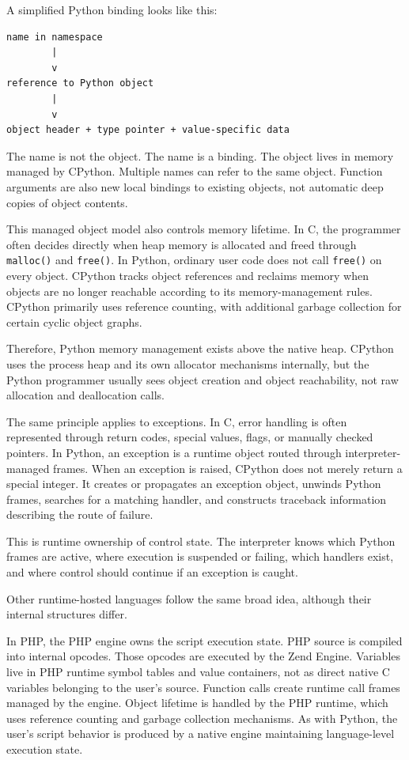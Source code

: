 \documentclass[a4paper,twoside]{report}
\begin{document}
A simplified Python binding looks like this:

\begin{verbatim}
name in namespace
        |
        v
reference to Python object
        |
        v
object header + type pointer + value-specific data
\end{verbatim}

The name is not the object. The name is a binding. The object lives in memory managed by CPython. Multiple names can refer to the same object. Function arguments are also new local bindings to existing objects, not automatic deep copies of object contents.

This managed object model also controls memory lifetime. In C, the programmer often decides directly when heap memory is allocated and freed through \texttt{malloc()} and \texttt{free()}. In Python, ordinary user code does not call \texttt{free()} on every object. CPython tracks object references and reclaims memory when objects are no longer reachable according to its memory-management rules. CPython primarily uses reference counting, with additional garbage collection for certain cyclic object graphs.

Therefore, Python memory management exists above the native heap. CPython uses the process heap and its own allocator mechanisms internally, but the Python programmer usually sees object creation and object reachability, not raw allocation and deallocation calls.

The same principle applies to exceptions. In C, error handling is often represented through return codes, special values, flags, or manually checked pointers. In Python, an exception is a runtime object routed through interpreter-managed frames. When an exception is raised, CPython does not merely return a special integer. It creates or propagates an exception object, unwinds Python frames, searches for a matching handler, and constructs traceback information describing the route of failure.

This is runtime ownership of control state. The interpreter knows which Python frames are active, where execution is suspended or failing, which handlers exist, and where control should continue if an exception is caught.

Other runtime-hosted languages follow the same broad idea, although their internal structures differ.

In PHP, the PHP engine owns the script execution state. PHP source is compiled into internal opcodes. Those opcodes are executed by the Zend Engine. Variables live in PHP runtime symbol tables and value containers, not as direct native C variables belonging to the user's source. Function calls create runtime call frames managed by the engine. Object lifetime is handled by the PHP runtime, which uses reference counting and garbage collection mechanisms. As with Python, the user's script behavior is produced by a native engine maintaining language-level execution state.
\end{document}
